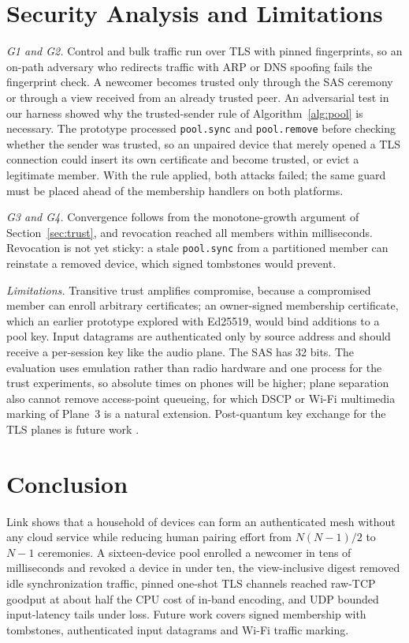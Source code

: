 \documentclass[conference,a4paper]{IEEEtran}
\begin{document}
\section{Security Analysis and Limitations}
\label{sec:security}
\textit{G1 and G2.} Control and bulk traffic run over TLS with pinned fingerprints, so an on-path adversary who redirects traffic with ARP or DNS spoofing fails the fingerprint check. A newcomer becomes trusted only through the SAS ceremony or through a view received from an already trusted peer. An adversarial test in our harness showed why the trusted-sender rule of Algorithm~\ref{alg:pool} is necessary. The prototype processed \texttt{pool.sync} and \texttt{pool.remove} before checking whether the sender was trusted, so an unpaired device that merely opened a TLS connection could insert its own certificate and become trusted, or evict a legitimate member. With the rule applied, both attacks failed; the same guard must be placed ahead of the membership handlers on both platforms.

\textit{G3 and G4.} Convergence follows from the monotone-growth argument of Section~\ref{sec:trust}, and revocation reached all members within milliseconds. Revocation is not yet sticky: a stale \texttt{pool.sync} from a partitioned member can reinstate a removed device, which signed tombstones would prevent.

\textit{Limitations.} Transitive trust amplifies compromise, because a compromised member can enroll arbitrary certificates; an owner-signed membership certificate, which an earlier prototype explored with Ed25519, would bind additions to a pool key. Input datagrams are authenticated only by source address and should receive a per-session key like the audio plane. The SAS has 32 bits. The evaluation uses emulation rather than radio hardware and one process for the trust experiments, so absolute times on phones will be higher; plane separation also cannot remove access-point queueing, for which DSCP or Wi-Fi multimedia marking of Plane~3 is a natural extension. Post-quantum key exchange for the TLS planes is future work \cite{montenegro2026pq}.

\section{Conclusion}
Link shows that a household of devices can form an authenticated mesh without any cloud service while reducing human pairing effort from $N(N-1)/2$ to $N-1$ ceremonies. A sixteen-device pool enrolled a newcomer in tens of milliseconds and revoked a device in under ten, the view-inclusive digest removed idle synchronization traffic, pinned one-shot TLS channels reached raw-TCP goodput at about half the CPU cost of in-band encoding, and UDP bounded input-latency tails under loss. Future work covers signed membership with tombstones, authenticated input datagrams and Wi-Fi traffic marking.



\end{document}
